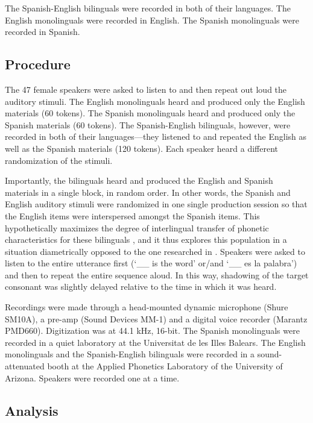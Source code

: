 \documentclass[a4paper]{article}
\begin{document}
The Spanish-English bilinguals were recorded in both of their languages. The English monolinguals were recorded in English. The Spanish monolinguals were recorded in Spanish.

\subsection{Procedure}

The 47 female speakers were asked to listen to and then repeat out loud the auditory stimuli. The English monolinguals heard and produced only the English materials (60 tokens). The Spanish monolinguals heard and produced only the Spanish materials (60 tokens). The Spanish-English bilinguals, however, were recorded in both of their languages---they listened to and repeated the English as well as the Spanish materials (120 tokens). Each speaker heard a different randomization of the stimuli.

Importantly, the bilinguals heard and produced the English and Spanish materials in a single block, in random order. In other words, the Spanish and English auditory stimuli were randomized in one single production session so that the English items were interspersed amongst the Spanish items. This hypothetically maximizes the degree of interlingual transfer of phonetic characteristics for these bilinguals \cite{olson2013bilingual}, and it thus explores this population in a situation diametrically opposed to the one researched in \cite{magloire1999cross}. Speakers were asked to listen to the entire utterance first (`\_\_ is the word' or/and `\_\_ es la palabra') and then to repeat the entire sequence aloud. In this way, shadowing of the target consonant was slightly delayed relative to the time in which it was heard.

Recordings were made through a head-mounted dynamic microphone (Shure SM10A), a pre-amp (Sound Devices MM-1) and a digital voice recorder (Marantz PMD660). Digitization was at 44.1 kHz, 16-bit. The Spanish monolinguals were recorded in a quiet laboratory at the Universitat de les Illes Balears. The English monolinguals and the Spanish-English bilinguals were recorded in a sound-attenuated booth at the Applied Phonetics Laboratory of the University of Arizona. Speakers were recorded one at a time.

\subsection{Analysis}
\end{document}
